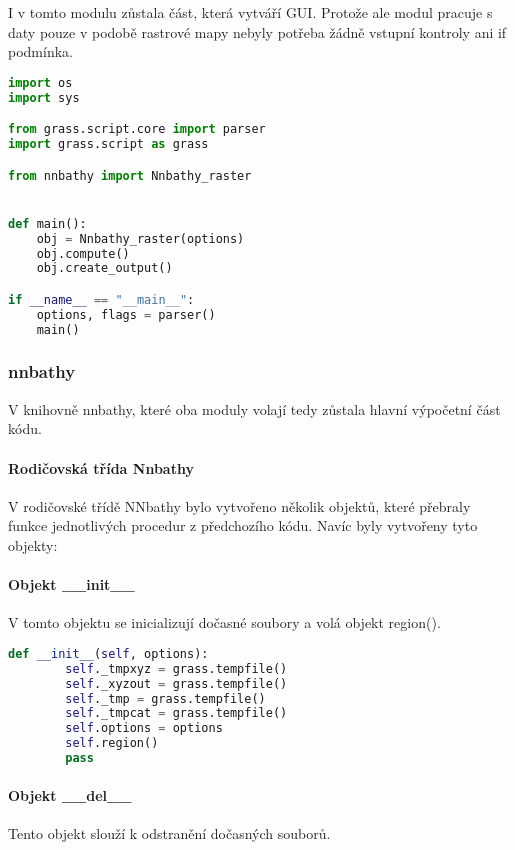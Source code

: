 \documentclass[12pt,a4paper]{article}
\begin{document}
I v tomto modulu zůstala část, která vytváří GUI. Protože ale modul pracuje s daty pouze v podobě rastrové mapy nebyly potřeba žádně vstupní kontroly ani if podmínka.

\begin{lstlisting}[language=python,caption={python version}]
import os
import sys

from grass.script.core import parser
import grass.script as grass

from nnbathy import Nnbathy_raster


def main():
    obj = Nnbathy_raster(options)
    obj.compute()
    obj.create_output()

if __name__ == "__main__":
    options, flags = parser()
    main()
\end{lstlisting}

\subsubsection{nnbathy}
V knihovně nnbathy, které oba moduly volají tedy zůstala hlavní výpočetní část kódu. 

\paragraph{Rodičovská třída Nnbathy} V rodičovské třídě NNbathy bylo vytvořeno několik objektů, které přebraly funkce jednotlivých procedur z předchozího kódu. Navíc byly vytvořeny tyto objekty:

\paragraph{Objekt \_\_init\_\_}
V tomto objektu se inicializují dočasné soubory a volá objekt region().

\begin{lstlisting}[language=python,caption={python version}]
def __init__(self, options):
        self._tmpxyz = grass.tempfile()
        self._xyzout = grass.tempfile()
        self._tmp = grass.tempfile()
        self._tmpcat = grass.tempfile()
        self.options = options
        self.region()
        pass
\end{lstlisting}

\paragraph{Objekt \_\_del\_\_}
Tento objekt slouží k odstranění dočasných souborů.
\end{document}
